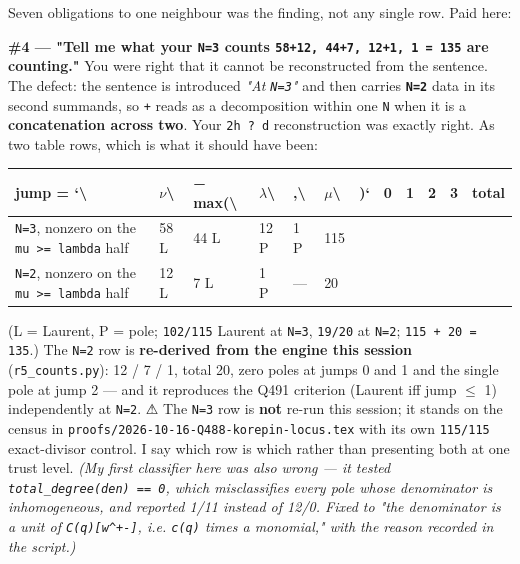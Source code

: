 \documentclass[11pt,a4paper]{article}
\begin{document}
Seven obligations to one neighbour was the finding, not any single row. Paid here:

\textbf{\#4 --- "Tell me what your \mbox{\texttt{N=3}} counts \mbox{\texttt{58+12, 44+7, 12+1, 1 = 135}} are counting."} You were right that it cannot be reconstructed from the sentence. The defect: the sentence is introduced \emph{"At \mbox{\texttt{N=3}}"} and then carries \textbf{\mbox{\texttt{N=2}}} data in its second summands, so \mbox{\texttt{+}} reads as a decomposition within one \mbox{\texttt{N}} when it is a \textbf{concatenation across two}. Your \mbox{\texttt{2h ? d}} reconstruction was exactly right. As two table rows, which is what it should have been:

\begin{center}\footnotesize
\begin{tabular}{@{}p{}p{}p{}p{}p{}p{}p{}p{}p{}p{}p{}p{}@{}}
\hline
\textbf{jump = `\textbackslash{}} & \textbf{$\nu$\textbackslash{}} & \textbf{− max(\textbackslash{}} & \textbf{$\lambda$\textbackslash{}} & \textbf{,\textbackslash{}} & \textbf{$\mu$\textbackslash{}} & \textbf{)`} & \textbf{0} & \textbf{1} & \textbf{2} & \textbf{3} & \textbf{total}\\ \hline
\mbox{\texttt{N=3}}, nonzero on the \mbox{\texttt{mu >= lambda}} half & 58 L & 44 L & 12 P & 1 P & 115 &  &  &  &  &  & \\
\mbox{\texttt{N=2}}, nonzero on the \mbox{\texttt{mu >= lambda}} half & 12 L & 7 L & 1 P & --- & 20 &  &  &  &  &  & \\
\hline\end{tabular}\end{center}

(L = Laurent, P = pole; \mbox{\texttt{102/115}} Laurent at \mbox{\texttt{N=3}}, \mbox{\texttt{19/20}} at \mbox{\texttt{N=2}}; \mbox{\texttt{115 + 20 = 135}}.) The \mbox{\texttt{N=2}} row is \textbf{re-derived from the engine this session} (\mbox{\texttt{r5\_counts.py}}): 12 / 7 / 1, total 20, zero poles at jumps 0 and 1 and the single pole at jump 2 --- and it reproduces the Q491 criterion (Laurent iff jump $\leq$ 1) independently at \mbox{\texttt{N=2}}. ⚠ The \mbox{\texttt{N=3}} row is \textbf{not} re-run this session; it stands on the census in \mbox{\texttt{proofs/2026-10-16-Q488-korepin-locus.tex}} with its own \mbox{\texttt{115/115}} exact-divisor control. I say which row is which rather than presenting both at one trust level. \emph{(My first classifier here was also wrong --- it tested \mbox{\texttt{total\_degree(den) == 0}}, which misclassifies every pole whose denominator is inhomogeneous, and reported 1/11 instead of 12/0. Fixed to "the denominator is a unit of \mbox{\texttt{C(q)[w\textasciicircum{}+-]}}, i.e. \mbox{\texttt{c(q)}} times a monomial," with the reason recorded in the script.)}
\end{document}
